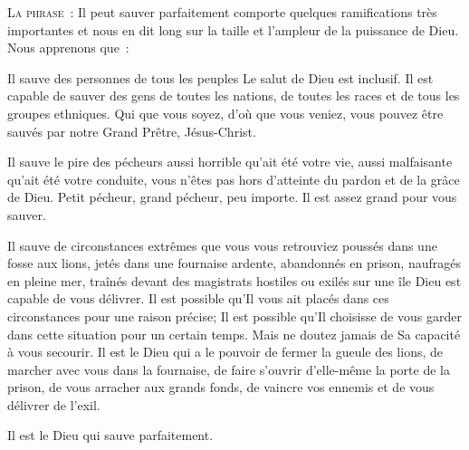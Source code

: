 \lettrine{L}{a phrase~:} 
 \Og Il peut sauver parfaitement \Fg{} comporte quelques ramifications
 très importantes et nous en dit long sur la taille et l'ampleur
 de la puissance de Dieu. Nous apprenons que~: 

Il sauve des personnes de tous les peuples
 \ocadr Le salut de Dieu est inclusif.
 Il est capable de sauver des gens de toutes les nations,
 de toutes les races et de tous les groupes ethniques.
 Qui que vous soyez, d'où que vous veniez,
 vous pouvez être sauvés par notre Grand Prêtre, Jésus-Christ. 


Il sauve le pire des pécheurs \ocadr aussi horrible qu'ait été votre vie,
 aussi malfaisante qu'ait été votre conduite, vous n'êtes pas
 hors d'atteinte du pardon et de la grâce de Dieu.
 Petit pécheur, grand pécheur, peu importe.
 Il est assez grand pour vous sauver. 

Il sauve de circonstances extrêmes \ocadr que vous vous retrouviez poussés
 dans une fosse aux lions, jetés dans une fournaise ardente,
 abandonnés en prison, naufragés en pleine mer,
 traînés devant des magistrats hostiles ou exilés sur une île
 \ocadr Dieu est capable de vous délivrer.
 Il est possible qu'Il vous ait placés dans ces circonstances
 pour une raison précise; Il est possible qu'Il choisisse de vous garder
 dans cette situation pour un certain temps.
 Mais ne doutez jamais de Sa capacité à vous secourir.
 Il est le Dieu qui a le pouvoir de fermer la gueule des lions,
 de marcher avec vous dans la fournaise, de faire s'ouvrir d'elle-même
 la porte de la prison, de vous arracher aux grands fonds,
 de vaincre vos ennemis et de vous délivrer de l'exil. 

Il est le Dieu qui sauve parfaitement. 

\dvrule






